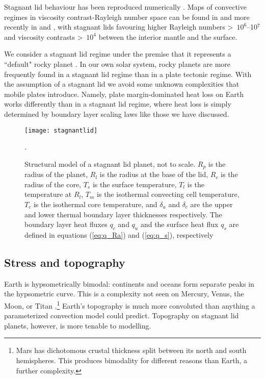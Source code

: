Stagnant lid behaviour has been reproduced numerically \citep{Solomatov1995, Moresi1995a, Solomatov1996a}. Maps of convective regimes in viscosity contrast-Rayleigh number space can be found in \citet{Solomatov1996a} and more recently in \citet{Huttig2011} and \citet{Miyagoshi2015}, with stagnant lids favouring higher Rayleigh numbers \textgreater~$10^{6}$--10$^{7}$ and viscosity contrasts \textgreater~$10^4$ between the interior mantle and the surface.

We consider a stagnant lid regime under the premise that it represents a ``default" rocky planet \citep{ORourke2012}. In our own solar system, rocky planets are more frequently found in a stagnant lid regime than in a plate tectonic regime. With the assumption of a stagnant lid we avoid some unknown complexities that mobile plates introduce. Namely, plate margin-dominated heat loss on Earth works differently \citep[and more efficiently---stagnant lid planets will run hotter for the same rheology and surface heat flow;][]{Stevenson2003} than in a stagnant lid regime, where heat loss is simply determined by boundary layer scaling laws like those we have discussed.


\begin{figure}

  \centering
  \texttt{[image: stagnantlid]}

\caption{Structural model of a stagnant lid planet, not to scale. $R_p$ is the radius of the planet, $R_l$ is the radius at the base of the lid, $R_c$ is the radius of the core, $T_s$ is the surface temperature, $T_l$ is the temperature at $R_l$, $T_m$ is the isothermal convecting cell temperature, $T_c$ is the isothermal core temperature, and $\delta_u$ and $\delta_c$ are the upper and lower thermal boundary layer thicknesses respectively. The boundary layer heat fluxes $q_c$ and $q_u$ and the surface heat flux $q_s$ are defined in equations (\ref{eq:q_Ra}) and (\ref{eq:q_s}), respectively}. 
\label{fig:stagnant_lid}
\end{figure}







\subsection{Stress and topography}

Earth is hypsometrically bimodal: continents and oceans form separate peaks in the hypsometric curve. This is a complexity not seen on Mercury, Venus, the Moon, or Titan \citep{Keller2009, Lorenz2011}.\footnote{Mars has dichotomous crustal thickness split between its north and south hemispheres. This produces bimodality for different reasons than Earth, a further complexity.} Earth's topography is much more convoluted than anything a parameterized convection model could predict. Topography on stagnant lid planets, however, is more tenable to modelling.


